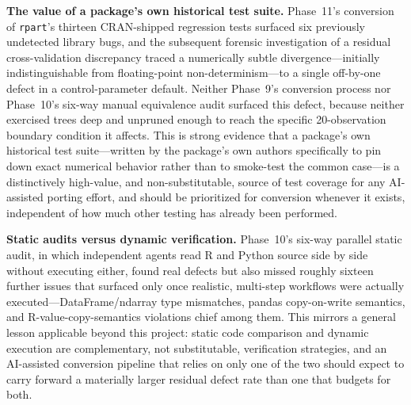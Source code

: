 \documentclass[12pt]{article}
\begin{document}
\textbf{The value of a package's own historical test suite.} Phase~11's conversion of \texttt{rpart}'s thirteen CRAN-shipped regression tests surfaced six previously undetected library bugs, and the subsequent forensic investigation of a residual cross-validation discrepancy traced a numerically subtle divergence---initially indistinguishable from floating-point non-determinism---to a single off-by-one defect in a control-parameter default. Neither Phase~9's conversion process nor Phase~10's six-way manual equivalence audit surfaced this defect, because neither exercised trees deep and unpruned enough to reach the specific 20-observation boundary condition it affects. This is strong evidence that a package's own historical test suite---written by the package's own authors specifically to pin down exact numerical behavior rather than to smoke-test the common case---is a distinctively high-value, and non-substitutable, source of test coverage for any AI-assisted porting effort, and should be prioritized for conversion whenever it exists, independent of how much other testing has already been performed.

\textbf{Static audits versus dynamic verification.} Phase~10's six-way parallel static audit, in which independent agents read R and Python source side by side without executing either, found real defects but also missed roughly sixteen further issues that surfaced only once realistic, multi-step workflows were actually executed---DataFrame/ndarray type mismatches, pandas copy-on-write semantics, and R-value-copy-semantics violations chief among them. This mirrors a general lesson applicable beyond this project: static code comparison and dynamic execution are complementary, not substitutable, verification strategies, and an AI-assisted conversion pipeline that relies on only one of the two should expect to carry forward a materially larger residual defect rate than one that budgets for both.
\end{document}
